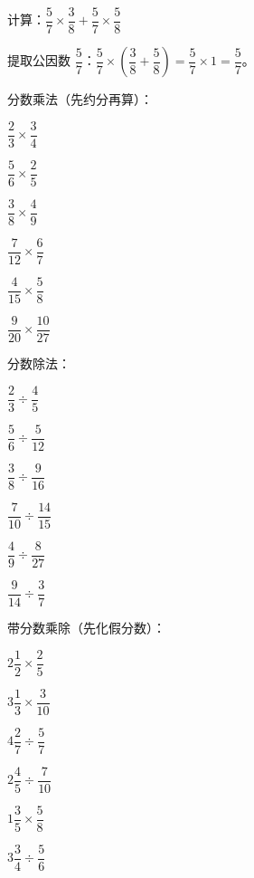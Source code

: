 \begin{example}
计算：$\dfrac{5}{7}\times\dfrac{3}{8}+\dfrac{5}{7}\times\dfrac{5}{8}$
\end{example}
\begin{solution}
提取公因数 $\dfrac{5}{7}$：$\dfrac{5}{7}\times\left(\dfrac{3}{8}+\dfrac{5}{8}\right) = \dfrac{5}{7}\times1 = \dfrac{5}{7}$。
\end{solution}

\begin{exercise}
\item 分数乘法（先约分再算）：
  \begin{subexercise}
    \item $\dfrac{2}{3}\times\dfrac{3}{4}$
    \item $\dfrac{5}{6}\times\dfrac{2}{5}$
    \item $\dfrac{3}{8}\times\dfrac{4}{9}$
    \item $\dfrac{7}{12}\times\dfrac{6}{7}$
    \item $\dfrac{4}{15}\times\dfrac{5}{8}$
    \item $\dfrac{9}{20}\times\dfrac{10}{27}$
  \end{subexercise}

\item 分数除法：
  \begin{subexercise}
    \item $\dfrac{2}{3}\div\dfrac{4}{5}$
    \item $\dfrac{5}{6}\div\dfrac{5}{12}$
    \item $\dfrac{3}{8}\div\dfrac{9}{16}$
    \item $\dfrac{7}{10}\div\dfrac{14}{15}$
    \item $\dfrac{4}{9}\div\dfrac{8}{27}$
    \item $\dfrac{9}{14}\div\dfrac{3}{7}$
  \end{subexercise}

\item 带分数乘除（先化假分数）：
  \begin{subexercise}
    \item $2\dfrac{1}{2}\times\dfrac{2}{5}$
    \item $3\dfrac{1}{3}\times\dfrac{3}{10}$
    \item $4\dfrac{2}{7}\div\dfrac{5}{7}$
    \item $2\dfrac{4}{5}\div\dfrac{7}{10}$
    \item $1\dfrac{3}{5}\times\dfrac{5}{8}$
    \item $3\dfrac{3}{4}\div\dfrac{5}{6}$
  \end{subexercise}


\end{exercise}
